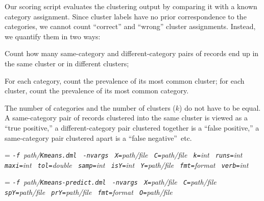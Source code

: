 Our scoring script evaluates the clustering output by comparing it with a known category
assignment.  Since cluster labels have no prior correspondence to the categories, we
cannot count ``correct'' and ``wrong'' cluster assignments.  Instead, we quantify them in
two ways:
\begin{Enumerate}
\item Count how many same-category and different-category pairs of records end up in the
same cluster or in different clusters;
\item For each category, count the prevalence of its most common cluster; for each
cluster, count the prevalence of its most common category.
\end{Enumerate}
The number of categories and the number of clusters ($k$) do not have to be equal.  
A same-category pair of records clustered into the same cluster is viewed as a
``true positive,'' a different-category pair clustered together is a ``false positive,''
a same-category pair clustered apart is a ``false negative''~etc.


\smallskip
{}
\smallskip

{\hangindent=\parindent\noindent\it%
{\tt{}-f }path/\/{\tt{}Kmeans.dml}
{\tt{} -nvargs}
{\tt{} X=}path/file
{\tt{} C=}path/file
{\tt{} k=}int
{\tt{} runs=}int
{\tt{} maxi=}int
{\tt{} tol=}double
{\tt{} samp=}int
{\tt{} isY=}int
{\tt{} Y=}path/file
{\tt{} fmt=}format
{\tt{} verb=}int

}

\smallskip
{}
\smallskip

{\hangindent=\parindent\noindent\it%
{\tt{}-f }path/\/{\tt{}Kmeans-predict.dml}
{\tt{} -nvargs}
{\tt{} X=}path/file
{\tt{} C=}path/file
{\tt{} spY=}path/file
{\tt{} prY=}path/file
{\tt{} fmt=}format
{\tt{} O=}path/file

}

